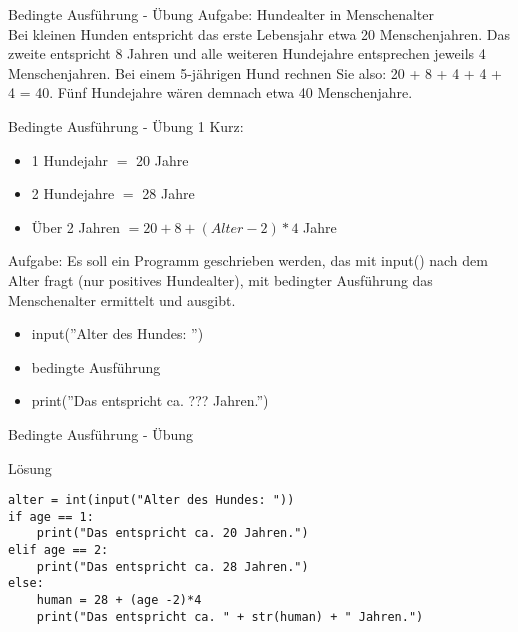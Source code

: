\begin{frame}{Bedingte Ausführung - Übung}
Aufgabe: Hundealter in Menschenalter\\
Bei kleinen Hunden entspricht das erste Lebensjahr etwa 20 Menschenjahren. Das zweite entspricht 8 Jahren und alle weiteren Hundejahre entsprechen jeweils 4 Menschenjahren. Bei einem 5-jährigen Hund rechnen Sie also: 20 + 8 + 4 + 4 + 4 = 40. Fünf Hundejahre wären demnach etwa 40 Menschenjahre.\\
\end{frame}
\begin{frame}{Bedingte Ausführung - Übung 1}
Kurz:
\begin{itemize}
\item 1 Hundejahr $=$ 20 Jahre
\item 2 Hundejahre $=$ 28 Jahre
\item Über 2 Jahren $= 20 + 8 + (Alter - 2)  *  4$ Jahre
\end{itemize}
Aufgabe:
Es soll ein Programm geschrieben werden, das mit input() nach dem Alter fragt (nur positives Hundealter), mit bedingter Ausführung das Menschenalter ermittelt und ausgibt.
\begin{itemize}
	\item input(''Alter des Hundes: '')
	\item bedingte Ausführung
	\item print(''Das entspricht ca. ??? Jahren.'')
\end{itemize}

\end{frame}

\begin{frame}[fragile]{Bedingte Ausführung - Übung}
\begin{exampleblock}{Lösung}
\begin{lstlisting}
alter = int(input("Alter des Hundes: "))
if age == 1:
	print("Das entspricht ca. 20 Jahren.")
elif age == 2:
	print("Das entspricht ca. 28 Jahren.")
else:
	human = 28 + (age -2)*4
	print("Das entspricht ca. " + str(human) + " Jahren.")
\end{lstlisting}
\end{exampleblock}
\end{frame}



